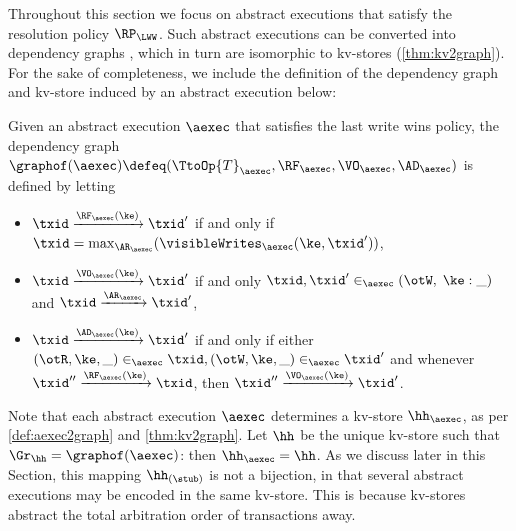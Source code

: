 Throughout this section we focus on abstract executions that satisfy the 
resolution policy $\RP_{\LWW}$.
Such abstract executions can be converted into dependency graphs \cite{SIanaysis,laws}, 
which in turn are isomorphic to kv-stores (\cref{thm:kv2graph}). For the sake of completeness, 
we include the definition of the dependency graph and kv-store induced by an abstract execution below: 

\begin{definition}
\label{def:aexec2graph}
Given an abstract execution $\aexec$ that satisfies the last write wins policy,
the dependency graph $\graphof(\aexec) \defeq (\TtoOp{T}_{\aexec}, \RF_{\aexec}, 
\VO_{\aexec}, \AD_{\aexec})$ is defined by letting
\begin{itemize}
\item $\txid \xrightarrow{\RF_{\aexec}(\ke)} \txid'$ if and only if 
$\txid = \max_{\AR_{\aexec}}(\visibleWrites_{\aexec}(\ke, \txid'))$, 
\item $\txid \xrightarrow{\VO_{\aexec}(\ke)} \txid'$ if and only 
$\txid, \txid' \in_{\aexec} (\otW, \;\ke: \_)$ 
and $\txid \xrightarrow{\AR_{\aexec}} \txid'$,
\item $\txid \xrightarrow{\AD_{\aexec}(\ke)} \txid'$ if and only if either 
$(\otR, \ke, \_) \in_{\aexec} \txid, (\otW, \ke, \_) \in_{\aexec} \txid'$ and 
whenever $\txid'' \xrightarrow{\RF_{\aexec}(\ke)} \txid$, 
then $\txid'' \xrightarrow{\VO_{\aexec}(\ke)} \txid'$.
\end{itemize}
\end{definition}
Note that each abstract execution $\aexec$ determines a kv-store 
$\hh_{\aexec}$, as per \cref{def:aexec2graph} and \cref{thm:kv2graph}. 
Let $\hh$ be the unique kv-store such that $\Gr_{\hh} = \graphof(\aexec)$: then 
$\hh_{\aexec} = \hh$. As we discuss later in this Section, this mapping 
$\hh_{(\stub)}$ is not a bijection, in that several abstract executions may be 
encoded in the same kv-store. This is because kv-stores abstract the total 
arbitration order of transactions away.


